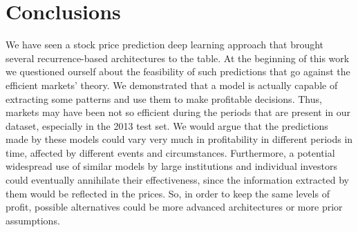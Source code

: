 \documentclass{article}
\begin{document}
\section{Conclusions}

We have seen a stock price prediction deep learning approach that brought several
recurrence-based architectures to the table. At the beginning of this work we questioned
ourself about the feasibility of such predictions that go against the efficient markets'
theory. We demonstrated that a model is actually capable of extracting some patterns and
use them to make profitable decisions. Thus, markets may have been not so efficient during
the periods that are present in our dataset, especially in the 2013 test set. We would
argue that the predictions made by these models could vary very much in profitability
in different periods in time, affected by different events and circumstances. Furthermore,
a potential widespread use of similar models by large institutions and individual investors
could eventually annihilate their effectiveness, since the information extracted by them would
be reflected in the prices. So, in order to keep the same levels of profit, possible
alternatives could be more advanced architectures or more prior assumptions.  




\end{document}
